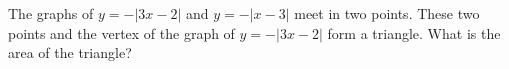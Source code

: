 The graphs of $y=-|3x-2|$ and $y=-|x-3|$ meet in two points. These two points and the vertex of the graph of $y=-|3x-2|$ form a triangle. What is the area of the triangle?
